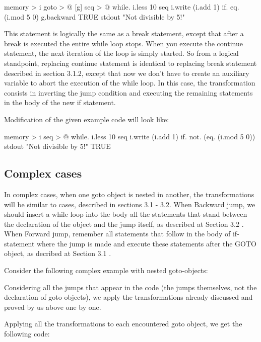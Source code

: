 \documentclass[sigplan,review,11pt,nonacm,natbib=false]{acmart}
\begin{document}
\begin{ffcode}
[]
 memory > i
 goto > @
  [g]
   seq > @
    while.
     i.less 10
     seq
      i.write (i.add 1)
      if.
       eq. (i.mod 5 0)
       g.backward
       TRUE
      stdout "Not divisible by 5!\n"
\end{ffcode}

This statement is logically the same as a break statement, except that after a break is executed the entire while loop stops. When you execute the continue statement, the next iteration of the loop is simply started.
So from a logical standpoint, replacing continue statement is identical to replacing break statement described in section 3.1.2, except that now we don't have to create an auxiliary variable to abort the execution of the while loop. In this case, the transformation consists in inverting the jump condition and executing the remaining statements in the body of the new if statement.

Modification of the given example code will look like:
\begin{ffcode}
[]
 memory > i
 seq > @
 while.
  i.less 10
  seq
   i.write (i.add 1)
   if.
    not. (eq. (i.mod 5 0))
    stdout "Not divisible by 5!\n"
    TRUE
\end{ffcode}


\subsection{Complex cases}
In complex cases, when one goto object is nested in another, the transformations will be similar to cases, described in sections 3.1 - 3.2. When Backward jump, we should insert a while loop into the body all the statements that stand between the declaration of the object and the jump itself, as described at Section 3.2 . When Forward jump, remember all statements that follow in the body of if-statement where the jump is made and execute these statements after the GOTO object, as decribed at Section 3.1 .

Consider the following complex example with nested goto-objects:
\begin{ffcode}

\end{ffcode}

Considering all the jumps that appear in the code (the jumps themselves, not the declaration of goto objects), we apply the transformations already discussed and proved by us above one by one.

Applying all the transformations to each encountered goto object, we get the following code:
\begin{ffcode}

\end{ffcode}
\end{document}

